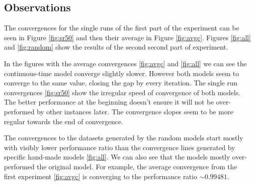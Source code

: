 \documentclass[thesis=M,english]{FITthesis}[2012/10/20]
\begin{document}
\subsection*{Observations }

The convergences for the single runs of the first part of the experiment can be seen
in Figure \ref{fig:sr50} and then their average in Figure \ref{fig:avgc}. Figures \ref{fig:all} and \ref{fig:random} show the results of the second second part of experiment.

In the figures with the average convergences \ref{fig:avgc} and \ref{fig:all} we can see the
continuous-time model converge slightly slower. However both models seem
to converge to the same value, closing the gap by every iteration.
The single run convergences \ref{fig:sr50} show the irregular speed of convergence of
both models. The better performance at the beginning doesn’t ensure it will
not be over-performed by other instances later. The convergence slopes seem
to be more regular towards the end of convergence.

The convergences to the datasets generated by the random models start
mostly with visibly lower performance ratio than the convergence lines generated by specific hand-made models \ref{fig:all}.
We can also see that the models mostly over-performed the original model.
For example, the average convergence from the first experiment \ref{fig:avgc} is converging to the performance ratio $\sim 0.99481$.  
\end{document}
